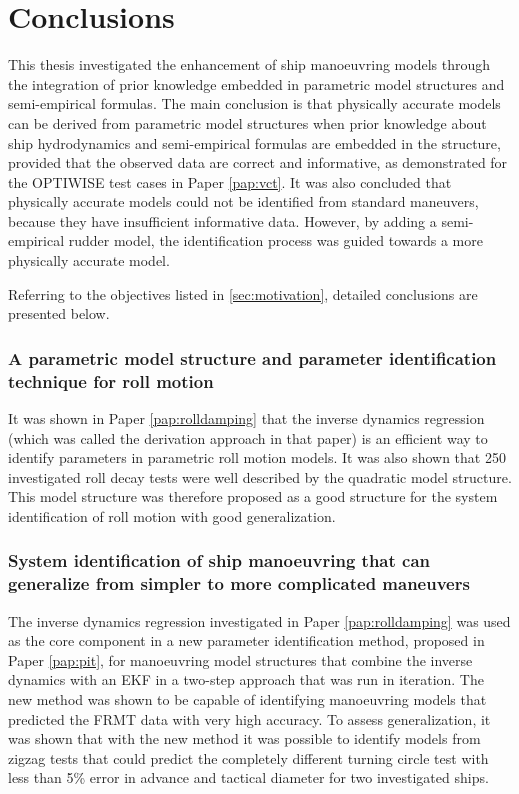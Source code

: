 \chapter{Conclusions\label{ch:conclusions}}

\noindent This thesis investigated the enhancement of ship manoeuvring models through the
integration of prior knowledge embedded in parametric model structures and semi-empirical
formulas. The main conclusion is that physically accurate models
can be derived from parametric model structures when prior knowledge about ship
hydrodynamics and semi-empirical formulas are embedded in the structure, provided
that the observed data are correct and informative, as demonstrated for the OPTIWISE test cases in Paper \ref{pap:vct}.
It was also concluded that physically accurate models could not be identified from standard maneuvers, because they have insufficient informative data. However, by adding a semi-empirical rudder model, the identification process was guided towards a more physically accurate model.

Referring to the objectives listed in \autoref{sec:motivation}, detailed conclusions are presented below.

\subsection*{A parametric model structure and parameter identification technique for roll motion}
It was shown in Paper \ref{pap:rolldamping} that the inverse dynamics regression (which was called the derivation approach in that paper) is an efficient way to identify parameters in parametric roll motion models. 
It was also shown that 250 investigated roll decay tests were well described by the quadratic model structure. This model structure was therefore proposed as a good structure for the system identification of roll motion with good generalization.  

\subsection*{System identification of ship manoeuvring that can generalize from simpler to more complicated maneuvers}
The inverse dynamics regression investigated in Paper \ref{pap:rolldamping} was used as the core component in a new parameter identification method, proposed in Paper \ref{pap:pit}, for manoeuvring model structures that combine the inverse dynamics with an EKF in a two-step approach \cite{yoonIdentificationHydrodynamicCoefficients2003} that was run in iteration.
The new method was shown to be capable of identifying manoeuvring models that predicted the FRMT data with very high accuracy.
To assess generalization, it was shown that with the new method it was possible to identify models from zigzag tests that could predict the completely different turning circle test with less than 5\% error in advance and tactical diameter for two investigated ships.


